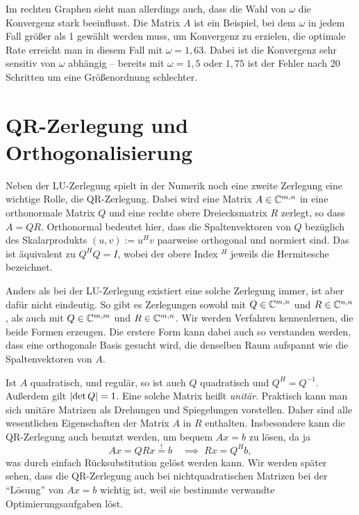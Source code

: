 Im rechten Graphen sieht man allerdings auch, dass die Wahl von
$\omega$ die Konvergenz stark beeinflusst. Die Matrix $A$ ist ein
Beispiel, bei dem $\omega$ in jedem Fall größer als 1 gewählt werden
muss, um Konvergenz zu erzielen, die optimale Rate erreicht man in
diesem Fall mit $\omega=1,63$. Dabei ist die Konvergenz sehr sensitiv
von $\omega$ abhängig -- bereits mit $\omega=1,5$ oder $1,75$ ist der
Fehler nach 20 Schritten um eine Größenordnung schlechter.

\section{QR-Zerlegung und Orthogonalisierung}

Neben der LU-Zerlegung spielt in der Numerik noch eine zweite
Zerlegung eine wichtige Rolle, die QR-Zerlegung. Dabei wird eine
Matrix $A\in\mathbb{C}^{m,n}$ in eine orthonormale Matrix $Q$ und eine rechte
obere Dreiecksmatrix $R$ zerlegt, so dass $A=QR$.  Orthonormal
bedeutet hier, dass die Spaltenvektoren von $Q$ bezüglich des
Skalarprodukts $(u,v) := u^Hv$ paarweise orthogonal und normiert
sind. Das ist äquivalent zu $Q^HQ=I$, wobei der obere Index $^H$
jeweils die Hermitesche bezeichnet.

Anders als bei der LU-Zerlegung existiert eine solche Zerlegung immer,
ist aber dafür nicht eindeutig. So gibt es Zerlegungen sowohl mit
$Q\in\mathbb{C}^{m,n}$ und $R\in\mathbb{C}^{n,n}$, als auch mit $Q\in\mathbb{C}^{m,m}$ und
$R\in\mathbb{C}^{m,n}$. Wir werden Verfahren kennenlernen, die beide Formen
erzeugen. Die erstere Form kann dabei auch so verstanden werden, dass
eine orthogonale Basis gesucht wird, die denselben Raum aufspannt wie
die Spaltenvektoren von $A$.

Ist $A$ quadratisch, und regulär, so ist auch $Q$ quadratisch und
$Q^H=Q^{-1}$. Außerdem gilt $\left\lvert{\det Q}\right\rvert = 1$. Eine solche Matrix
heißt \emph{unitär}. Praktisch kann man sich unitäre Matrizen als
Drehungen und Spiegelungen vorstellen. Daher sind alle wesentlichen
Eigenschaften der Matrix $A$ in $R$ enthalten. Insbesondere kann die
QR-Zerlegung auch benutzt werden, um bequem $Ax=b$ zu lösen, da ja
\begin{equation}
  Ax=QRx\stackrel{!}{=} b\quad\implies\;
  Rx=Q^H b,
\end{equation}
was durch einfach Rücksubstitution gelöst werden kann. Wir werden
später sehen, dass die QR-Zerlegung auch bei nichtquadratischen
Matrizen bei der "`Lösung"' von $Ax=b$ wichtig ist, weil sie bestimmte
verwandte Optimierungsaufgaben löst.

